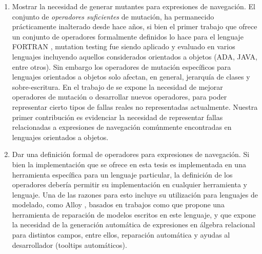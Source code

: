 \begin{enumerate}
	\item Mostrar la necesidad de generar mutantes para expresiones de navegaci\'on. El conjunto de \emph{operadores suficientes} de mutaci\'on, ha permanecido pr\'acticamente inalterado desde hace a\~nos, si bien el primer trabajo que ofrece un conjunto de operadores formalmente definidos lo hace para el lenguaje FORTRAN \cite{bibliography.mutation.definitions.fortranOffut87, bibliography.mutation.definitions.fortranKing91}, mutation testing fue siendo aplicado y evaluado en varios lenguajes incluyendo aquellos considerados orientados a objetos (ADA, JAVA, entre otros). Sin embargo los operadores de mutaci\'on espec\'ificos para lenguajes orientados a objetos solo afectan, en general, jerarqu\'ia de clases y sobre-escritura. En el trabajo de \cite{bibliography.mutation.evaluation.valid-substitute} se expone la necesidad de mejorar operadores de mutaci\'on o desarrollar nuevos operadores, para poder representar cierto tipos de fallas reales no representadas actualmente. Nuestra primer contribuci\'on es evidenciar la necesidad de representar fallas relacionadas a expresiones de navegaci\'on com\'unmente encontradas en lenguajes orientados a objetos.
	
	\item Dar una definici\'on formal de operadores para expresiones de navegaci\'on. Si bien la implementaci\'on que se ofrece en esta tesis es implementada en una herramienta espec\'ifica para un lenguaje particular, la definici\'on de los operadores deber\'ia permitir su implementaci\'on en cualquier herramienta y lenguaje. Una de las razones para esto incluye su utilizaci\'on para lenguajes de modelado, como Alloy \cite{bibliography.books.SoftwareAbstractions-alloy}, basados en trabajos como \cite{bibliography.repair.mutation.AlloyWang18} que propone una herramienta de reparaci\'on de modelos escritos en este lenguaje, y \cite{bibliography.algebraicExpressions.RexGenWang18} que expone la necesidad de la generaci\'on autom\'atica de expresiones en \'algebra relacional para distintos campos, entre ellos, reparaci\'on autom\'atica y ayudas al desarrollador (tooltips autom\'aticos).
	

\end{enumerate}
